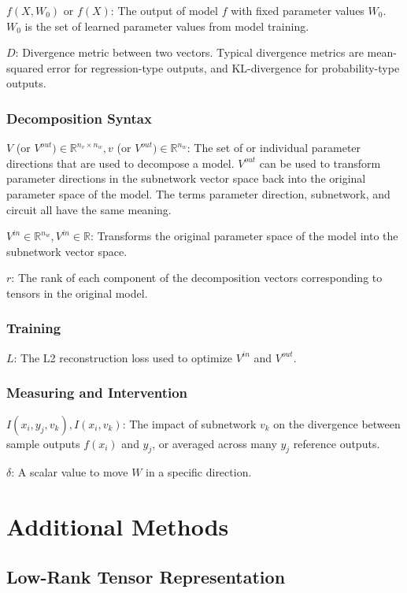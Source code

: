 \documentclass{article}
\theoremstyle{plain}
\theoremstyle{definition}
\theoremstyle{remark}
\begin{document}
$f(X, W_0)$ or $f(X)$: The output of model $f$ with fixed parameter values $W_0 $. $W_0$ is the set of learned parameter values from model training.

$D$: Divergence metric between two vectors. Typical divergence metrics are mean-squared error for regression-type outputs, and KL-divergence for probability-type outputs. 

\subsubsection{Decomposition Syntax}
$V$ (or $V^{out}) \in \mathbb{R}^{n_v \times n_w}, v$ (or $V^{out})  \in \mathbb{R}^{n_w}$: The set of or individual parameter directions that are used to decompose a model. $V^{out}$ can be used to transform parameter directions in the subnetwork vector space back into the original parameter space of the model. The terms parameter direction, subnetwork, and circuit all have the same meaning. 

$V^{in} \in \mathbb{R}^{n_w}, V^{in} \in \mathbb{R}$: Transforms the original parameter space of the model into the subnetwork vector space. 

$r$: The rank of each component of the decomposition vectors corresponding to tensors in the original model. 

\subsubsection{Training}

$L$: The L2 reconstruction loss used to optimize $V^{in}$ and $V^{out}$.

\subsubsection{Measuring and Intervention}
$I(x_i, y_j, v_k), I(x_i, v_k)$: The impact of subnetwork $v_k$ on the divergence between sample outputs $f(x_i)$ and $y_j$, or averaged across many $y_j$ reference outputs.

$\delta$: A scalar value to move $W$ in a specific direction. 


\section{Additional Methods}

\subsection{Low-Rank Tensor Representation}\label{sec:low_rank}
\end{document}
